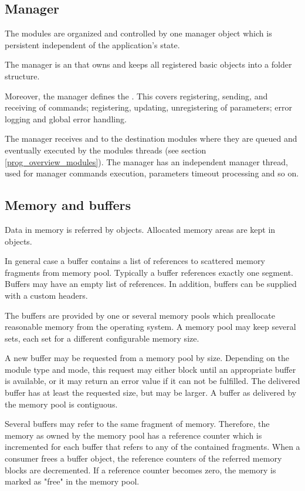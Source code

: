 \subsection{Manager}
The modules are organized and controlled by one manager object
which is persistent independent of the application's state.

The manager is an  that owns and keeps all 
registered basic objects into a folder structure. 

Moreover, the manager defines the . 
This covers registering, sending, and receiving of commands; registering, 
updating, unregistering of parameters; error logging and global error handling. 

The manager receives and  
to the destination modules where they are queued and eventually executed 
by the modules threads (see section \ref{prog_overview_modules}).
The manager has an independent manager thread, used for 
manager commands execution, parameters timeout processing and so on. 
 
 
\subsection{Memory and buffers}
Data in memory is referred by   objects. 
Allocated memory areas are kept in 
 objects. 
   

In general case a buffer contains a list of references to scattered memory 
fragments from memory pool. Typically a buffer references exactly one segment.
Buffers may have an empty list of references. In addition, buffers can be supplied
with a custom headers.
 
The buffers are provided by one or several memory pools 
which preallocate reasonable memory from the operating system. 
A memory pool may keep several sets, each set for a different 
configurable memory size.

A new buffer may be requested from a memory pool by size. 
Depending on the module type and mode, this request may either block until an 
appropriate buffer is available, or it may return an error value 
if it can not be fulfilled. The delivered buffer has at 
least the requested size, but may be larger. A buffer as 
delivered by the memory pool is contiguous. 

Several buffers may refer to the same fragment of memory. 
Therefore, the memory as owned by the memory pool has a 
reference counter which is incremented for each buffer 
that refers to any of the contained fragments. When a consumer frees 
a buffer object, the reference counters of the referred 
memory blocks are decremented. If a reference counter becomes 
zero, the memory is marked as "free" in the memory pool.

